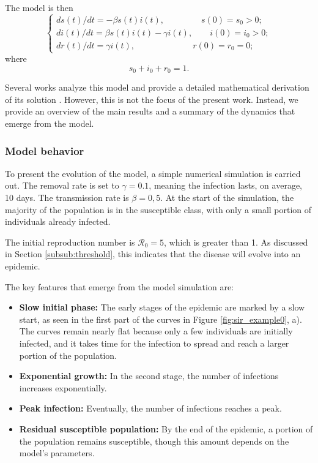 The model is then
\begin{equation}
	\begin{cases}
		ds(t) / dt = -\beta s(t) i(t), \;\qquad \qquad s(0) = s_0 >0;\\
		di(t) / dt =  \beta s(t) i(t) - \gamma i(t), \qquad i(0) = i_0 > 0;\\
		dr(t) / dt =  \gamma i(t), \qquad \; \, \;\quad \quad \qquad r(0) = r_0 = 0;
	\end{cases}
\end{equation}
where
\begin{equation}
s_0 + i_0 + r_0 = 1.
\end{equation}

Several works analyze this model and provide a detailed mathematical derivation of its solution \cite{CITA}. However, this is not the focus of the present work. Instead, we provide an overview of the main results and a summary of the dynamics that emerge from the model.

\subsubsection{Model behavior}

To present the evolution of the model, a simple numerical simulation is carried out. The removal rate is set to $\gamma = 0.1$, meaning the infection lasts, on average, 10 days. The transmission rate is $\beta = 0,5$. At the start of the simulation, the majority of the population is in the susceptible class, with only a small portion of individuals already infected.

The initial reproduction number is  $\mathcal{R}_0 = 5$, which is greater than 1. As discussed in Section \ref{subsub:threshold}, this indicates that the disease will evolve into an epidemic.

The key features that emerge from the model simulation are:

\begin{itemize}
	\item \textbf{Slow initial phase:} The early stages of the epidemic are marked by a slow start, as seen in the first part of the curves in Figure \ref{fig:sir_example0}, a). The curves remain nearly flat because only a few individuals are initially infected, and it takes time for the infection to spread and reach a larger portion of the population.
	\item \textbf{Exponential growth:} In the second stage, the number of infections increases exponentially.
	\item \textbf{Peak infection:} Eventually, the number of infections reaches a peak.
	\item \textbf{Residual susceptible population:} By the end of the epidemic, a portion of the population remains susceptible, though this amount depends on the model's parameters.
\end{itemize}

